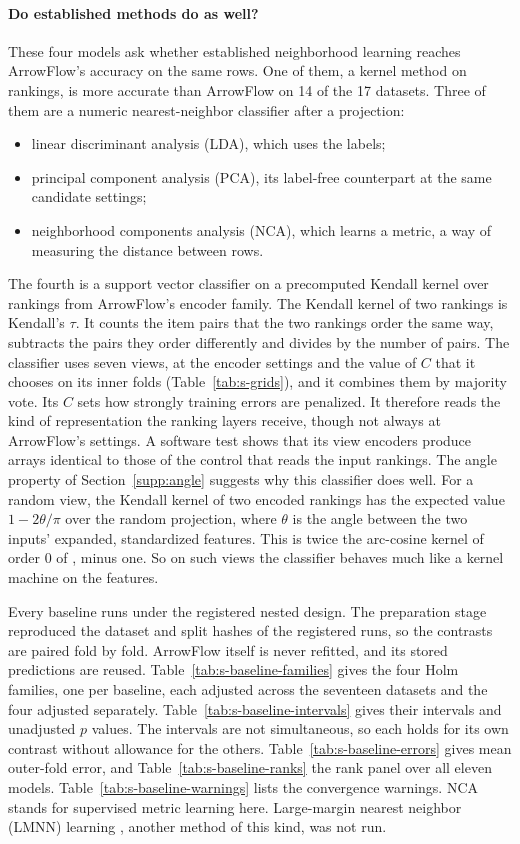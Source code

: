 \paragraph{Do established methods do as well?} These four models ask whether established neighborhood learning reaches ArrowFlow's accuracy on the same rows. One of them, a kernel method on rankings, is more accurate than ArrowFlow on 14 of the 17 datasets. Three of them are a numeric nearest-neighbor classifier after a projection:
\begin{itemize}[leftmargin=2em,topsep=2pt,itemsep=1pt]
\item linear discriminant analysis (LDA), which uses the labels;
\item principal component analysis (PCA), its label-free counterpart at the same candidate settings;
\item neighborhood components analysis (NCA), which learns a metric, a way of measuring the distance between rows.
\end{itemize}
The fourth is a support vector classifier on a precomputed Kendall kernel over rankings from ArrowFlow's encoder family. The Kendall kernel of two rankings is Kendall's $\tau$. It counts the item pairs that the two rankings order the same way, subtracts the pairs they order differently and divides by the number of pairs. The classifier uses seven views, at the encoder settings and the value of $C$ that it chooses on its inner folds (Table~\ref{tab:s-grids}), and it combines them by majority vote. Its $C$ sets how strongly training errors are penalized. It therefore reads the kind of representation the ranking layers receive, though not always at ArrowFlow's settings. A software test shows that its view encoders produce arrays identical to those of the control that reads the input rankings. The angle property of Section~\ref{supp:angle} suggests why this classifier does well. For a random view, the Kendall kernel of two encoded rankings has the expected value $1-2\theta/\pi$ over the random projection, where $\theta$ is the angle between the two inputs' expanded, standardized features. This is twice the arc-cosine kernel of order 0 of \citet{cho2009kernel}, minus one. So on such views the classifier behaves much like a kernel machine on the features.

Every baseline runs under the registered nested design. The preparation stage reproduced the dataset and split hashes of the registered runs, so the contrasts are paired fold by fold. ArrowFlow itself is never refitted, and its stored predictions are reused. Table~\ref{tab:s-baseline-families} gives the four Holm families, one per baseline, each adjusted across the seventeen datasets and the four adjusted separately. Table~\ref{tab:s-baseline-intervals} gives their intervals and unadjusted $p$ values. The intervals are not simultaneous, so each holds for its own contrast without allowance for the others. Table~\ref{tab:s-baseline-errors} gives mean outer-fold error, and Table~\ref{tab:s-baseline-ranks} the rank panel over all eleven models. Table~\ref{tab:s-baseline-warnings} lists the convergence warnings. NCA stands for supervised metric learning here. Large-margin nearest neighbor (LMNN) learning \citep{weinberger2009lmnn}, another method of this kind, was not run.

